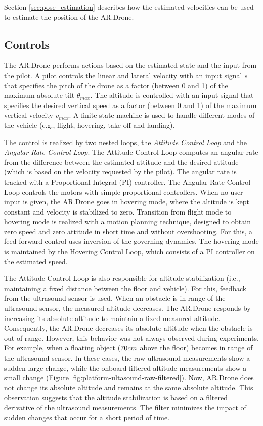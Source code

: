 Section \ref{sec:pose_estimation} describes how the estimated velocities can be used to estimate the position of the AR.Drone.



\subsection{Controls}
\label{sec:platform-controls}
The AR.Drone performs actions based on the estimated state and the input from the pilot.
A pilot controls the linear and lateral velocity with an input signal $s$ that specifies the pitch of the drone as a factor (between 0 and 1) of the maximum absolute tilt $\theta_{max}$.
The altitude is controlled with an input signal that specifies the desired vertical speed as a factor (between 0 and 1) of the maximum vertical velocity $v_{max}$.
A finite state machine is used to handle different modes of the vehicle (e.g., flight, hovering, take off and landing).

The control is realized by two nested loops, the \textit{Attitude Control Loop} and the \textit{Angular Rate Control Loop}.
The Attitude Control Loop computes an angular rate from the difference between the estimated attitude and the desired attitude (which is based on the velocity requested by the pilot).
The angular rate is tracked with a Proportional Integral (PI) controller.
The Angular Rate Control Loop controls the motors with simple proportional controllers.
When no user input is given, the AR.Drone goes in hovering mode, where the altitude is kept constant and velocity is stabilized to zero.
Transition from flight mode to hovering mode is realized with a motion planning technique, designed to obtain zero speed and zero attitude in short time and without overshooting.
For this, a feed-forward control uses inversion of the governing dynamics.
The hovering mode is maintained by the Hovering Control Loop, which consists of a PI controller on the estimated speed.

The Attitude Control Loop is also responsible for altitude stabilization (i.e., maintaining a fixed distance between the floor and vehicle).
For this, feedback from the ultrasound sensor is used.
When an obstacle is in range of the ultrasound sensor, the measured altitude decreases.
The AR.Drone responds by increasing its absolute altitude to maintain a fixed measured altitude.
Consequently, the AR.Drone decreases its absolute altitude when the obstacle is out of range.
However, this behavior was not always observed during experiments.
For example, when a floating object ($70\small{cm}$ above the floor) becomes in range of the ultrasound sensor.
In these cases, the raw ultrasound measurements show a sudden large change, while the onboard filtered altitude measurements show a small change (Figure \ref{fig:platform-ultasound-raw-filtered}).
Now, AR.Drone does not change its absolute altitude and remains at the same absolute altitude.
This observation suggests that the altitude stabilization is based on a filtered derivative of the ultrasound measurements.
The filter minimizes the impact of sudden changes that occur for a short period of time.

